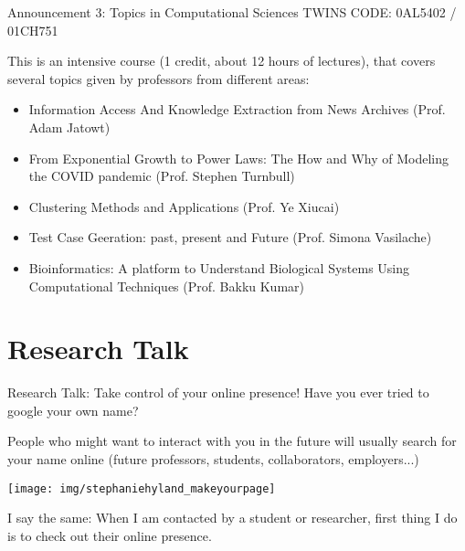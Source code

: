 \begin{frame}{Announcement 3: Topics in Computational Sciences}
  {TWINS CODE: 0AL5402 / 01CH751}

  This is an intensive course (1 credit, about 12 hours of lectures), that covers several topics given by professors from different areas:\bigskip

\begin{itemize}
  \item Information Access And Knowledge Extraction from News Archives (Prof. Adam Jatowt)
  \item From Exponential Growth to Power Laws: The How and Why of Modeling the COVID pandemic (Prof. Stephen Turnbull)
  \item Clustering Methods and Applications (Prof. Ye Xiucai)
  \item Test Case Geeration: past, present and Future (Prof. Simona Vasilache)
  \item Bioinformatics: A platform to Understand Biological Systems Using Computational Techniques (Prof. Bakku Kumar)
\end{itemize}
\end{frame}

\section{Research Talk}

\begin{frame}{Research Talk: Take control of your online presence!}
  Have you ever tried to google your own name?\bigskip

  People who might want to interact with you in the future will usually search for your name online (future professors, students, collaborators, employers...)\bigskip

  \centering\texttt{[image: img/stephaniehyland\_makeyourpage]}\bigskip

  I say the same: When I am contacted by a student or researcher, first thing I do is to check out their online presence.
\end{frame}

